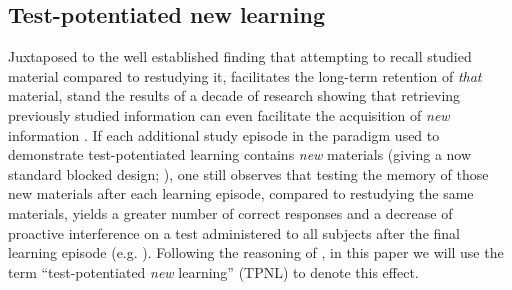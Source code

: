 \documentclass[../main.tex]{subfiles}
\begin{document}
\hypertarget{tpnl}{%
\subsection{Test-potentiated new learning}}

Juxtaposed to the well established finding that attempting to recall studied material compared to restudying it, facilitates the long-term retention of \textit{that} material, stand the results of a decade of research showing that retrieving previously studied information can even facilitate the acquisition of \textit{new} information \citep{chanRetrievalPotentiatesNew2018, yangEnhancingLearningRetrieval2018}. If each additional study episode in the paradigm used to demonstrate test-potentiated learning contains \textit{new} materials (giving a now standard blocked design; \citealp{chanTestingPotentiatesNew2018}), one still observes that testing the memory of those new materials after each learning episode, compared to restudying the same materials, yields a greater number of correct responses and a decrease of proactive interference on a test administered to all subjects after the final learning episode (e.g. \citealp{szpunarInterpolatedMemoryTests2013, szpunarTestingStudyInsulates2008, wissmanInterimTestEffect2011}). Following the reasoning of \cite{chanRetrievalPotentiatesNew2018}, in this paper we will use the term ``test-potentiated \textit{new} learning'' (TPNL) to denote this effect.
\end{document}
